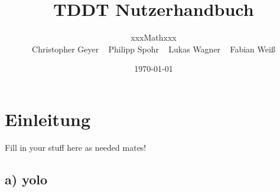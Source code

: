 \documentclass[10pt,a4paper]{article}
\begin{document}
\title{\large TDDT Nutzerhandbuch}
\date{\small \today}
\author{\normalsize xxxMathxxx \\
Christopher Geyer ~
Philipp Spohr ~
Lukas Wagner ~
Fabian Weiß }
\maketitle
\tableofcontents
\section{Einleitung}
Fill in your stuff here as needed mates!
\subsection{a) yolo}
\end{document}
